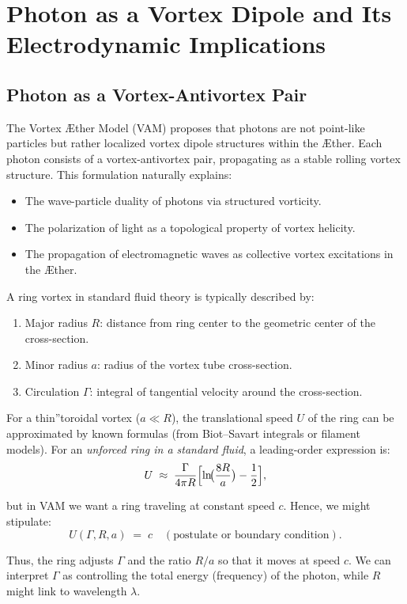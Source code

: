 
\section{Photon as a Vortex Dipole and Its Electrodynamic Implications}

\subsection{Photon as a Vortex-Antivortex Pair}
The Vortex Æther Model (VAM) proposes that photons are not point-like particles but rather localized vortex dipole structures within the Æther. Each photon consists of a vortex-antivortex pair, propagating as a stable rolling vortex structure. This formulation naturally explains:
\begin{itemize}
    \item The wave-particle duality of photons via structured vorticity.
    \item The polarization of light as a topological property of vortex helicity.
    \item The propagation of electromagnetic waves as collective vortex excitations in the Æther.
\end{itemize}

A ring vortex in standard fluid theory is typically described by:
\begin{enumerate}
    \item Major radius $R$: distance from ring center to the geometric center of the cross-section.
    \item Minor radius $a$: radius of the vortex tube cross-section.
    \item Circulation $\Gamma$: integral of tangential velocity around the cross-section.
\end{enumerate}

For a \grqq thin\textquotedblright toroidal vortex ($ a \ll R$), the translational speed $U$ of the ring can be approximated by known formulas (from Biot–Savart integrals or filament models). For an \textit{unforced ring in a standard fluid}, a leading-order expression is:
$$ U
\;\approx\;
\frac{\Gamma}{4\pi R}
\Bigl[\ln\!\bigl(\frac{8R}{a}\bigr) - \frac{1}{2}\Bigr], $$

but in VAM we want a ring traveling at constant speed $c$. Hence, we might stipulate:
$$ U(\Gamma, R, a)
\;=\;
c
\quad
(\text{postulate or boundary condition}). $$

Thus, the ring adjusts $\Gamma$ and the ratio $R/a$ so that it moves at speed $c$. We can interpret $\Gamma$ as controlling the total energy (frequency) of the photon, while $R$ might link to wavelength $\lambda$.

